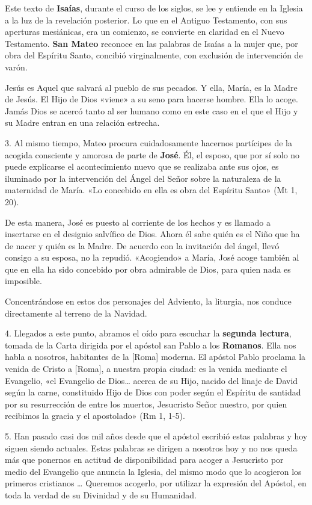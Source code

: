 \documentclass[]{article}
\begin{document}
Este texto de \textbf{Isaías}, durante el curso de los siglos, se lee y
entiende en la Iglesia a la luz de la revelación posterior. Lo que en el
Antiguo Testamento, con sus aperturas mesiánicas, era un comienzo, se
convierte en claridad en el Nuevo Testamento. \textbf{San Mateo}
reconoce en las palabras de Isaías a la mujer que, por obra del Espíritu
Santo, concibió virginalmente, con exclusión de intervención de varón.

Jesús es Aquel que salvará al pueblo de sus pecados. Y ella, María, es
la Madre de Jesús. El Hijo de Dios «viene» a su seno para hacerse
hombre. Ella lo acoge. Jamás Dios se acercó tanto al ser humano como en
este caso en el que el Hijo y su Madre entran en una relación estrecha.

3. Al mismo tiempo, Mateo procura cuidadosamente hacernos partícipes de
la acogida consciente y amorosa de parte de \textbf{José}. Él, el
esposo, que por sí solo no puede explicarse el acontecimiento nuevo que
se realizaba ante sus ojos, es iluminado por la intervención del Ángel
del Señor sobre la naturaleza de la maternidad de María. «Lo concebido
en ella es obra del Espíritu Santo» (Mt 1, 20).

De esta manera, José es puesto al corriente de los hechos y es llamado a
insertarse en el designio salvífico de Dios. Ahora él sabe quién es el
Niño que ha de nacer y quién es la Madre. De acuerdo con la invitación
del ángel, llevó consigo a su esposa, no la repudió. «Acogiendo» a
María, José acoge también al que en ella ha sido concebido por obra
admirable de Dios, para quien nada es imposible.

Concentrándose en estos dos personajes del Adviento, la liturgia, nos
conduce directamente al terreno de la Navidad.

4. Llegados a este punto, abramos el oído para escuchar la
\textbf{segunda lectura}, tomada de la Carta dirigida por el apóstol san
Pablo a los \textbf{Romanos}. Ella nos habla a nosotros, habitantes de
la {[}Roma{]} moderna. El apóstol Pablo proclama la venida de Cristo a
{[}Roma{]}, a nuestra propia ciudad: es la venida mediante el Evangelio,
«el Evangelio de Dios\ldots{} acerca de su Hijo, nacido del linaje de
David según la carne, constituido Hijo de Dios con poder según el
Espíritu de santidad por su resurrección de entre los muertos,
Jesucristo Señor nuestro, por quien recibimos la gracia y el apostolado»
(Rm 1, 1-5).

5. Han pasado casi dos mil años desde que el apóstol escribió estas
palabras y hoy siguen siendo actuales. Estas palabras se dirigen a
nosotros hoy y no nos queda más que ponernos en actitud de
disponibilidad para acoger a Jesucristo por medio del Evangelio que
anuncia la Iglesia, del mismo modo que lo acogieron los primeros
cristianos \ldots{} Queremos acogerlo, por utilizar la expresión del
Apóstol, en toda la verdad de su Divinidad y de su Humanidad.
\end{document}
